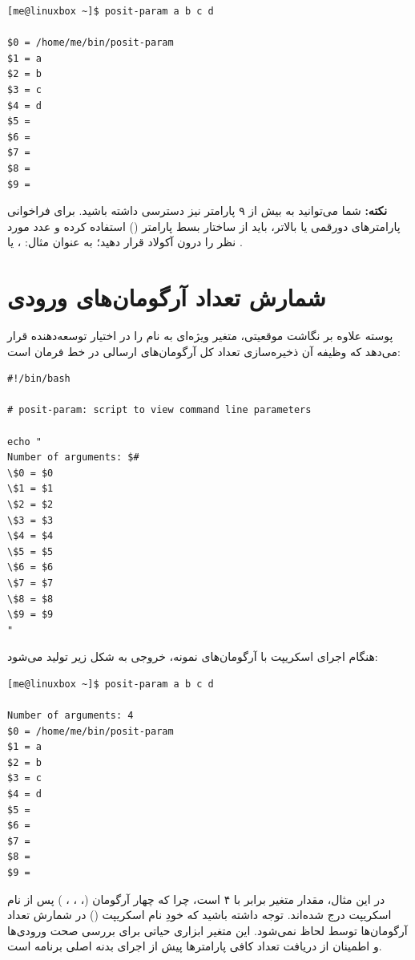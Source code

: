 \begin{latin}
\begin{lstlisting}
[me@linuxbox ~]$ posit-param a b c d

$0 = /home/me/bin/posit-param
$1 = a
$2 = b
$3 = c
$4 = d
$5 =
$6 =
$7 =
$8 =
$9 =
\end{lstlisting}
\end{latin}

\begin{note}
\textbf{نکته:} شما می‌توانید به بیش از ۹ پارامتر نیز دسترسی داشته باشید. برای فراخوانی پارامترهای دورقمی یا بالاتر، باید از ساختار بسط پارامتر () استفاده کرده و عدد مورد نظر را درون آکولاد قرار دهید؛ به عنوان مثال: ،  یا .
\end{note}

\section{شمارش تعداد آرگومان‌های ورودی}

پوسته  علاوه بر نگاشت موقعیتی، متغیر ویژه‌ای به نام \cmd{\$\#} را در اختیار توسعه‌دهنده قرار می‌دهد که وظیفه آن ذخیره‌سازی تعداد کل آرگومان‌های ارسالی در خط فرمان است:

\begin{latin}
\begin{lstlisting}
#!/bin/bash

# posit-param: script to view command line parameters

echo "
Number of arguments: $#
\$0 = $0
\$1 = $1
\$2 = $2
\$3 = $3
\$4 = $4
\$5 = $5
\$6 = $6
\$7 = $7
\$8 = $8
\$9 = $9
"
\end{lstlisting}
\end{latin}

هنگام اجرای اسکریپت با آرگومان‌های نمونه، خروجی به شکل زیر تولید می‌شود:

\begin{latin}
\begin{lstlisting}
[me@linuxbox ~]$ posit-param a b c d

Number of arguments: 4
$0 = /home/me/bin/posit-param
$1 = a
$2 = b
$3 = c
$4 = d
$5 =
$6 =
$7 =
$8 =
$9 =
\end{lstlisting}
\end{latin}

در این مثال، مقدار متغیر \cmd{\$\#} برابر با ۴ است، چرا که چهار آرگومان (، ، ، ) پس از نام اسکریپت درج شده‌اند. توجه داشته باشید که خودِ نام اسکریپت () در شمارش تعداد آرگومان‌ها توسط \cmd{\$\#} لحاظ نمی‌شود. این متغیر ابزاری حیاتی برای بررسی صحت ورودی‌ها و اطمینان از دریافت تعداد کافی پارامترها پیش از اجرای بدنه اصلی برنامه است.

